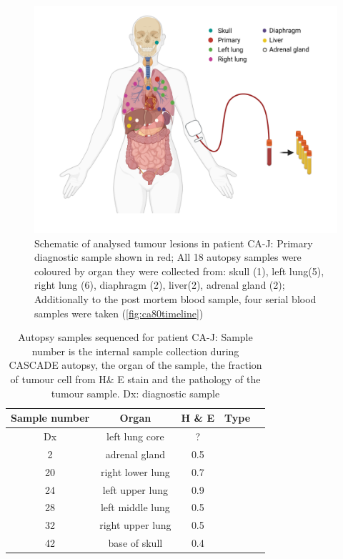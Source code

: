 \begin{figure}[ht]
\centering
\includegraphics[width=.99\linewidth]{Figures/CASCADE/CA80/CA-J_schematic_CA80_organColours}
\caption[Schematic of analysed tumour lesions in patient CA-J]{Schematic of analysed tumour lesions in patient CA-J: Primary diagnostic sample shown in red; All 18 autopsy samples were coloured by organ they were collected from: skull (1), left lung(5), right lung (6), diaphragm (2), liver(2), adrenal gland (2); Additionally to the post mortem blood sample, four serial blood samples were taken (\protect\autoref{fig:ca80timeline})} \label{fig:cas80schematic}
\end{figure}

\begin{table}[ht]
\caption[Autopsy samples sequenced for patient CA-J]{Autopsy samples sequenced for patient CA-J: Sample number is the internal sample collection during CASCADE autopsy, the organ of the sample, the fraction of tumour cell from H\& E stain and the pathology of the tumour sample. Dx: diagnostic sample}\label{tab:ca80wgsSamples}
\centering
{}
\begin{tabular}{|c|c|c|c|c|}
\toprule
\hline
 \rowcolor{gray!50}
\textbf{Sample number} & \textbf{Organ} & \textbf{H \& E} & \textbf{Type}\\
\hline
 Dx & left lung core & ? & \cellcolor{white} \\
 2 & adrenal gland & 0.5 & \cellcolor{white} \\
 20 & right lower lung & 0.7 & \cellcolor{white} \\
 24 & left upper lung & 0.9 & \cellcolor{white} \\
 28 & left middle lung & 0.5 & \cellcolor{white} \\
 32 & right upper lung & 0.5 & \cellcolor{white} \\
 42 & base of skull & 0.4 & \cellcolor{white}\multirow{-7}{*}{adenocarcinoma} \\
 \hline
\bottomrule
\end{tabular}
\end{table} 


